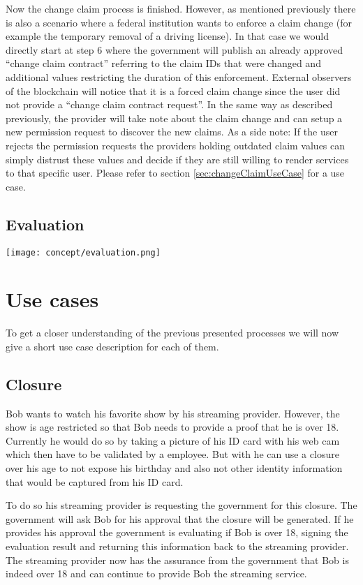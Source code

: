 Now the change claim process is finished. However, as mentioned previously there is also a scenario where a federal institution wants to enforce a claim change (for example the temporary removal of a driving license). In that case we would directly start at step 6 where the government will publish an already approved “change claim contract” referring to the claim IDs that were changed and additional values restricting the duration of this enforcement. External observers of the blockchain will notice that it is a forced claim change since the user did not provide a “change claim contract request”. In the same way as described previously, the provider will take note about the claim change and can setup a new permission request to discover the new claims. As a side note: If the user rejects the permission requests the providers holding outdated claim values can simply distrust these values and decide if they are still willing to render services to that specific user. Please refer to section \ref{sec:changeClaimUseCase} for a use case.

\subsection{Evaluation}

\texttt{[image: concept/evaluation.png]}
 
\section{Use cases}

To get a closer understanding of the previous presented processes we will now give a short use case description for each of them. 

\subsection{Closure}
\label{sec:closureUserCase}

Bob wants to watch his favorite show by his streaming provider. However, the show is age restricted so that Bob needs to provide a proof that he is over 18. Currently he would do so by taking a picture of his ID card with his web cam which then have to be validated by a employee. But with \projectName{} he can use a closure over his age to not expose his birthday and also not other identity information that would be captured from his ID card. 

To do so his streaming provider is requesting the government for this closure. The government will ask Bob for his approval that the closure will be generated. If he provides his approval the government is evaluating if Bob is over 18, signing the evaluation result and returning this information back to the streaming provider. The streaming provider now has the assurance from the government that Bob is indeed over 18 and can continue to provide Bob the streaming service. 

